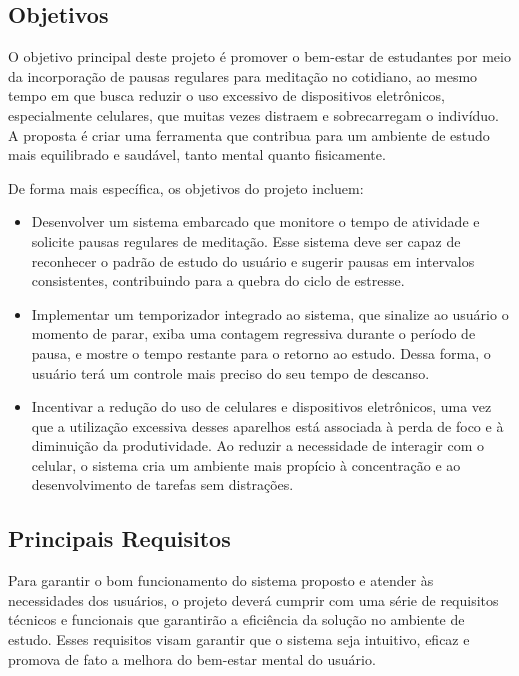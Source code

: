 \documentclass{article}
\begin{document}
\subsection{Objetivos}

O objetivo principal deste projeto é promover o bem-estar de estudantes por meio da incorporação de pausas regulares para meditação no cotidiano, ao mesmo tempo em que busca reduzir o uso excessivo de dispositivos eletrônicos, especialmente celulares, que muitas vezes distraem e sobrecarregam o indivíduo. A proposta é criar uma ferramenta que contribua para um ambiente de estudo mais equilibrado e saudável, tanto mental quanto fisicamente.

De forma mais específica, os objetivos do projeto incluem: \begin{itemize} \item Desenvolver um sistema embarcado que monitore o tempo de atividade e solicite pausas regulares de meditação. Esse sistema deve ser capaz de reconhecer o padrão de estudo do usuário e sugerir pausas em intervalos consistentes, contribuindo para a quebra do ciclo de estresse. \item Implementar um temporizador integrado ao sistema, que sinalize ao usuário o momento de parar, exiba uma contagem regressiva durante o período de pausa, e mostre o tempo restante para o retorno ao estudo. Dessa forma, o usuário terá um controle mais preciso do seu tempo de descanso. \item Incentivar a redução do uso de celulares e dispositivos eletrônicos, uma vez que a utilização excessiva desses aparelhos está associada à perda de foco e à diminuição da produtividade. Ao reduzir a necessidade de interagir com o celular, o sistema cria um ambiente mais propício à concentração e ao desenvolvimento de tarefas sem distrações. \end{itemize}

\subsection{Principais Requisitos}

Para garantir o bom funcionamento do sistema proposto e atender às necessidades dos usuários, o projeto deverá cumprir com uma série de requisitos técnicos e funcionais que garantirão a eficiência da solução no ambiente de estudo. Esses requisitos visam garantir que o sistema seja intuitivo, eficaz e promova de fato a melhora do bem-estar mental do usuário.
\end{document}
